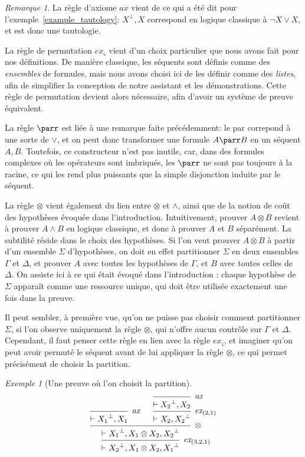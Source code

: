 \documentclass[11pt,a4paper]{article}
\theoremstyle{plain}
\theoremstyle{definition}
\theoremstyle{remark}
\newtheorem{remark}{Remarque}
\newtheorem{example}{Exemple}
\newcommand*{\orth}{^\perp}
\newcommand*{\tensor}{\otimes}
\newcommand*{\axv}[1]{\infer{0}[\ensuremath{\mathit{ax}}]{\vdash #1}}
\newcommand*{\tensorv}[1]{\infer{2}[\ensuremath{\tensor}]{\vdash #1}}
\newcommand*{\permv}[2]{\infer{1}[\ensuremath{\textit{ex}_{#1}}]{\vdash #2}}
\newcommand*{\someperm}{\varsigma}
\newcommand*{\sequent}{\Gamma}
\newcommand*{\sequentbis}{\Delta}
\begin{document}
\begin{remark}
    La règle d'axiome $\mathit{ax}$ vient de ce qui a été dit pour l'exemple~\ref{example_tautology}: $X\orth, X$ correspond en logique classique à $\neg X \lor X$, et est donc une tautologie.

    La règle de permutation $\textit{ex}_{\someperm}$ vient d'un choix particulier que nous avons fait pour nos définitions. De manière classique, les séquents sont définis comme des \textit{ensembles} de formules, mais nous avons choisi ici de les définir comme des \textit{listes}, afin de simplifier la conception de notre assistant et les démonstrations. Cette règle de permutation devient alors nécessaire, afin d'avoir un système de preuve équivalent.
    
    La règle $\parr$ est liée à une remarque faite précédemment: le par correpond à une sorte de $\lor$, et on peut donc transformer une formule $A \parr B$ en un séquent $A, B$. Toutefois, ce constructeur n'est pas inutile, car, dans des formules complexes où les opérateurs sont imbriqués, les $\parr$ ne sont pas toujours à la racine, ce qui les rend plus puissants que la simple disjonction induite par le séquent.
    
    La règle $\tensor$ vient également du lien entre $\tensor$ et $\land$, ainsi que de la notion de coût des hypothèses évoquée dans l'introduction. Intuitivement, prouver $A \tensor B$ revient à prouver $A \land B$ en logique classique, et donc à prouver $A$ et $B$ séparément. La subtilité réside dans le choix des hypothèses. Si l'on veut prouver $A \tensor B$ à partir d'un ensemble $\Sigma$ d'hypothèses, on doit en effet partitionner $\Sigma$ en deux ensembles $\sequent$ et $\sequentbis$, et prouver $A$ avec toutes les hypothèses de $\sequent$, et $B$ avec toutes celles de $\sequentbis$. On assiste ici à ce qui était évoqué dans l'introduction : chaque hypothèse de $\Sigma$ apparaît comme une ressource unique, qui doit être utilisée exactement une fois dans la preuve. 
    
    Il peut sembler, à première vue, qu'on ne puisse pas choisir comment partitionner $\Sigma$, si l'on observe uniquement la règle $\tensor$, qui n'offre aucun contrôle sur $\sequent$ et $\sequentbis$. Cependant, il faut penser cette règle en lien avec la règle $\textit{ex}_{\someperm}$, et imaginer qu'on peut avoir permuté le séquent avant de lui appliquer la règle $\tensor$, ce qui permet précisément de choisir la partition.
    
    \begin{example}[Une preuve où l'on choisit la partition]
    \begin{equation*}
        \begin{prooftree}
            \axv{{X_1}\orth, X_1}
            \axv{{X_2}\orth, X_2}
            \permv{(2, 1)}{X_2, {X_2}\orth}
            \tensorv{{X_1}\orth, X_1 \tensor X_2, {X_2}\orth}
            \permv{(3, 2, 1)}{{X_2}\orth, X_1 \tensor X_2, {X_1}\orth}
        \end{prooftree}
    \end{equation*}
    \end{example}
\end{remark}
\end{document}
